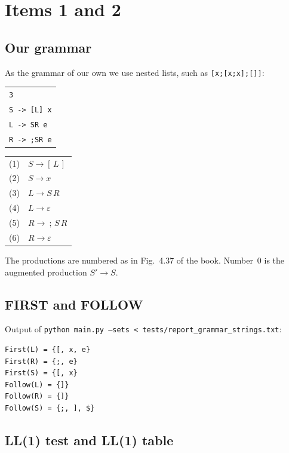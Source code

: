 \documentclass[11pt,a4paper]{article}
\newcommand{\code}[1]{\texttt{#1}}
\begin{document}
\section{Items 1 and 2}

\subsection{Our grammar}

As the grammar of our own we use nested lists, such as \code{[x;[x;x];[]]}:
\begin{center}
\begin{tabular}{l}
\code{3}\\
\code{S -> [L] x}\\
\code{L -> SR e}\\
\code{R -> ;SR e}
\end{tabular}
\qquad\qquad
\begin{tabular}{rl}
(1) & $S \to [\,L\,]$\\
(2) & $S \to x$\\
(3) & $L \to S\,R$\\
(4) & $L \to \varepsilon$\\
(5) & $R \to\ ;\,S\,R$\\
(6) & $R \to \varepsilon$
\end{tabular}
\end{center}
The productions are numbered as in Fig.~4.37 of the book. Number~0 is the augmented production $S' \to S$.

\subsection{FIRST and FOLLOW}

Output of \code{python main.py --sets < tests/report\_grammar\_strings.txt}:
\begin{lstlisting}
First(L) = {[, x, e}
First(R) = {;, e}
First(S) = {[, x}
Follow(L) = {]}
Follow(R) = {]}
Follow(S) = {;, ], $}
\end{lstlisting}

\subsection{LL(1) test and LL(1) table}
\end{document}
